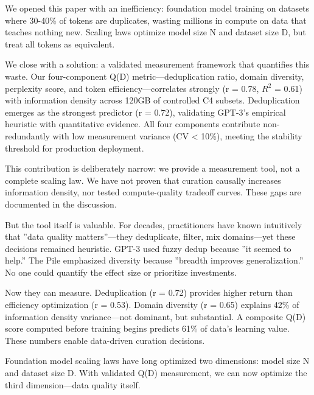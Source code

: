 
We opened this paper with an inefficiency: foundation model training on datasets where 30-40\% of tokens are duplicates, wasting millions in compute on data that teaches nothing new. Scaling laws optimize model size N and dataset size D, but treat all tokens as equivalent.

We close with a solution: a validated measurement framework that quantifies this waste. Our four-component Q(D) metric---deduplication ratio, domain diversity, perplexity score, and token efficiency---correlates strongly (r = 0.78, $R^2$ = 0.61) with information density across 120GB of controlled C4 subsets. Deduplication emerges as the strongest predictor (r = 0.72), validating GPT-3's empirical heuristic with quantitative evidence. All four components contribute non-redundantly with low measurement variance (CV < 10\%), meeting the stability threshold for production deployment.

This contribution is deliberately narrow: we provide a measurement tool, not a complete scaling law. We have not proven that curation causally increases information density, nor tested compute-quality tradeoff curves. These gaps are documented in the discussion.

But the tool itself is valuable. For decades, practitioners have known intuitively that ''data quality matters''---they deduplicate, filter, mix domains---yet these decisions remained heuristic. GPT-3 used fuzzy dedup because ''it seemed to help.'' The Pile emphasized diversity because ''breadth improves generalization.'' No one could quantify the effect size or prioritize investments.

Now they can measure. Deduplication (r = 0.72) provides higher return than efficiency optimization (r = 0.53). Domain diversity (r = 0.65) explains 42\% of information density variance---not dominant, but substantial. A composite Q(D) score computed before training begins predicts 61\% of data's learning value. These numbers enable data-driven curation decisions.

Foundation model scaling laws have long optimized two dimensions: model size N and dataset size D. With validated Q(D) measurement, we can now optimize the third dimension---data quality itself.
